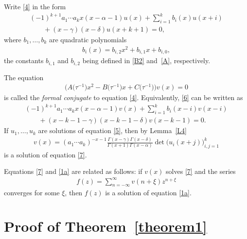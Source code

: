 \documentclass[pdftex]{sigma}
\numberwithin{equation}{section}
\def\lc{,\allowbreak\ldots,\allowbreak}
\begin{document}
Write \eqref{4} in the form
\begin{gather}
(-1)^{k+1}a_1\cdots a_k x(x-\alpha-1) u(x) +\sum_{i=1}^k b_i(x) u(x+i) \nonumber\\
\qquad{} +(x-\gamma)(x-\delta) u(x+k+1) = 0, \label{5}
\end{gather}
where $b_1\lc b_k$ are quadratic polynomials
\begin{gather*}%
b_i(x)=b_{i,2}x^2+b_{i,1}x+b_{i,0},
\end{gather*}
the constants $b_{i,1}$ and $b_{i,2}$ being defined in \eqref{B2} and~\eqref{A}, respectively.

The equation
\begin{gather}
\big(A\big(\tau^{-1}\big) x^2-B\big(\tau^{-1}\big) x+C\big(\tau^{-1}\big)\big)v(x)=0\label{6}
\end{gather}
is called the {\it formal conjugate} to equation \eqref{4}. Equivalently, \eqref{6} can be written as
\begin{gather}
(-1)^{k+1}a_1\cdots a_k x(x-\alpha-1) v(x) +\sum_{i=1}^k b_i(x-i) v(x-i)\nonumber\\
\qquad{} + (x-k-1-\gamma)(x-k-1-\delta) v(x-k-1) = 0. \label{7}
\end{gather}
If $u_1\lc u_k$ are solutions of equation \eqref{5}, then by Lemma~\ref{L4}
\begin{gather}
v(x) = (a_1\cdots a_k)^{-x-1} \frac{\Gamma(x-\gamma) \Gamma(x-\delta)}{\Gamma(x+1) \Gamma(x-\alpha)}\det\bigl(u_i(x+j)\bigr)_{i,j=1}^k\label{8}
\end{gather}
is a solution of equation \eqref{7}.

Equations \eqref{7} and \eqref{1a} are related as follows: if $v(x)$ solves \eqref{7} and the series
\begin{gather}
f(z) = \sum_{n=-\infty}^\infty v(n+\xi) z^{n+\xi}\label{8a}
\end{gather}
converges for some $\xi $, then $f(z)$ is a solution of equation \eqref{1a}.

\section{Proof of Theorem~\ref{theorem1}}\label{section5}
\end{document}
